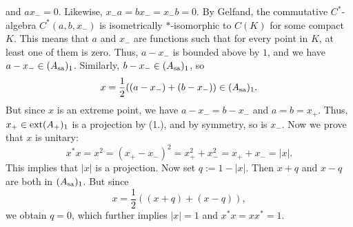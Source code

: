 \begin{myproof}
\begin{enumerate}
    and $a x_- = 0$. Likewise, $x_- a = b x_- = x_- b = 0$. By Gelfand, the commutative $C^*$-algebra $C^*(a, b, x_-)$
    is isometrically $*$-isomorphic to $C(K)$ for some compact $K$. This means that $a$ and $x_-$ are functions such that for every point in $K$,
    at least one of them is zero. Thus, $a - x_-$ is bounded above by $1$, and we have $a - x_- \in (A_{\operatorname{sa}})_1$.
    Similarly, $b - x_- \in (A_{\operatorname{sa}})_1$, so $$x = \frac{1}{2}((a - x_-) + (b - x_-)) \in (A_{\operatorname{sa}})_1.$$
    But since $x$ is an extreme point, we have $a - x_- = b - x_-$ and $a = b = x_+$.
    Thus, $x_+ \in \operatorname{ext} (A_+)_1$ is a projection by (1.), and by symmetry, so is $x_-$. Now we prove that $x$ is unitary:
    $$x^* x = x^2 = (x_+ - x_-)^2 = x_+ ^2 + x_- ^2 = x_+ + x_- = |x|.$$
    This implies that $|x|$ is a projection. Now set $q := 1 - |x|$.
    Then $x + q$ and $x - q$ are both in $(A_{\operatorname{sa}})_1$. But since
    $$x = \frac{1}{2} ((x + q) + (x - q)),$$
    we obtain $q = 0$, which further implies $|x| = 1$ and $x^* x = x x^* = 1$. \qedhere
  \end{enumerate}
\end{myproof}

